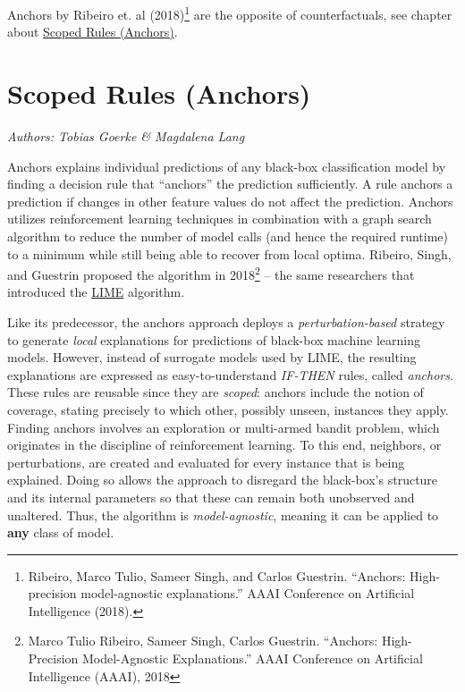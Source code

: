 \documentclass[12pt,]{krantz}
\begin{document}
Anchors by Ribeiro et. al (2018)\footnote{Ribeiro, Marco Tulio, Sameer
  Singh, and Carlos Guestrin. ``Anchors: High-precision model-agnostic
  explanations.'' AAAI Conference on Artificial Intelligence (2018).}
are the opposite of counterfactuals, see chapter about
\protect\hyperlink{anchors}{Scoped Rules (Anchors)}.

\newpage

\hypertarget{anchors}{\section{Scoped Rules (Anchors)}\label{anchors}}

\emph{Authors: Tobias Goerke \& Magdalena Lang}

Anchors explains individual predictions of any black-box classification
model by finding a decision rule that ``anchors'' the prediction
sufficiently. A rule anchors a prediction if changes in other feature
values do not affect the prediction. Anchors utilizes reinforcement
learning techniques in combination with a graph search algorithm to
reduce the number of model calls (and hence the required runtime) to a
minimum while still being able to recover from local optima. Ribeiro,
Singh, and Guestrin proposed the algorithm in 2018\footnote{Marco Tulio
  Ribeiro, Sameer Singh, Carlos Guestrin. ``Anchors: High-Precision
  Model-Agnostic Explanations.'' AAAI Conference on Artificial
  Intelligence (AAAI), 2018} -- the same researchers that introduced the
\protect\hyperlink{lime}{LIME} algorithm.

Like its predecessor, the anchors approach deploys a
\emph{perturbation-based} strategy to generate \emph{local} explanations
for predictions of black-box machine learning models. However, instead
of surrogate models used by LIME, the resulting explanations are
expressed as easy-to-understand \emph{IF-THEN} rules, called
\emph{anchors}. These rules are reusable since they are \emph{scoped}:
anchors include the notion of coverage, stating precisely to which
other, possibly unseen, instances they apply. Finding anchors involves
an exploration or multi-armed bandit problem, which originates in the
discipline of reinforcement learning. To this end, neighbors, or
perturbations, are created and evaluated for every instance that is
being explained. Doing so allows the approach to disregard the
black-box's structure and its internal parameters so that these can
remain both unobserved and unaltered. Thus, the algorithm is
\emph{model-agnostic}, meaning it can be applied to \textbf{any} class
of model.
\end{document}
